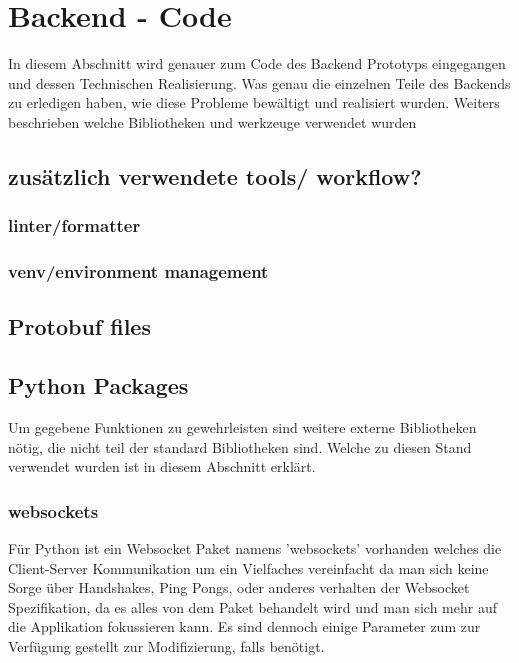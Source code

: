 \section{Backend - Code}
In diesem Abschnitt wird genauer zum Code des Backend Prototyps eingegangen 
und dessen Technischen Realisierung. 
Was genau die einzelnen Teile des Backends zu erledigen haben, 
wie diese Probleme bewältigt und realisiert wurden.
Weiters beschrieben welche Bibliotheken und werkzeuge verwendet wurden 

\subsection{zusätzlich verwendete tools/ workflow?}
\subsubsection{linter/formatter} 
\subsubsection{venv/environment management}



\subsection{Protobuf files}

\subsection{Python Packages}
Um gegebene Funktionen zu gewehrleisten sind weitere externe Bibliotheken nötig, 
die nicht teil der standard Bibliotheken sind.
Welche zu diesen Stand verwendet wurden ist in diesem Abschnitt erklärt.

\subsubsection{websockets}
Für Python ist ein Websocket Paket namens 'websockets' vorhanden welches die Client-Server Kommunikation
um ein Vielfaches vereinfacht da man sich keine Sorge über Handshakes, Ping Pongs, oder anderes verhalten
der Websocket Spezifikation, da es alles von dem Paket behandelt wird 
und man sich mehr auf die Applikation fokussieren kann. 
Es sind dennoch einige Parameter zum zur Verfügung gestellt zur Modifizierung, falls benötigt.

